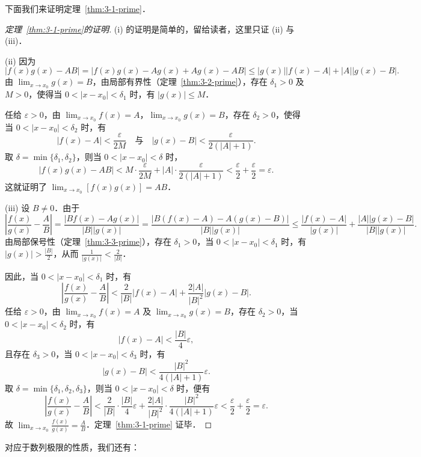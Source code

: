 下面我们来证明定理~\ref{thm:3-1-prime}．

\begin{proof}[定理~\ref{thm:3-1-prime}的证明]
(i) 的证明是简单的，留给读者，这里只证 (ii) 与 (iii)．

(ii) 因为
\[
|f(x)g(x) - AB| = |f(x)g(x) - Ag(x) + Ag(x) - AB| \leqslant |g(x)||f(x) - A| + |A||g(x) - B|.
\]
由 $\lim_{x \to x_0} g(x) = B$，由局部有界性（定理~\ref{thm:3-2-prime}），存在 $\delta_1 > 0$ 及 $M > 0$，使得当 $0 < |x - x_0| < \delta_1$ 时，有 $|g(x)| \leqslant M$．

任给 $\varepsilon > 0$，由 $\lim_{x \to x_0} f(x) = A$，$\lim_{x \to x_0} g(x) = B$，存在 $\delta_2 > 0$，使得当 $0 < |x - x_0| < \delta_2$ 时，有
\[
|f(x) - A| < \frac{\varepsilon}{2M} \quad \text{与} \quad |g(x) - B| < \frac{\varepsilon}{2(|A| + 1)}.
\]
取 $\delta = \min\{\delta_1, \delta_2\}$，则当 $0 < |x - x_0| < \delta$ 时，
\[
|f(x)g(x) - AB| < M \cdot \frac{\varepsilon}{2M} + |A| \cdot \frac{\varepsilon}{2(|A| + 1)} < \frac{\varepsilon}{2} + \frac{\varepsilon}{2} = \varepsilon.
\]
这就证明了 $\lim_{x \to x_0} [f(x)g(x)] = AB$．

(iii) 设 $B \neq 0$．由于
\[
\left|\frac{f(x)}{g(x)} - \frac{A}{B}\right| = \frac{|B f(x) - A g(x)|}{|B||g(x)|} = \frac{|B(f(x) - A) - A(g(x) - B)|}{|B||g(x)|} \leqslant \frac{|f(x) - A|}{|g(x)|} + \frac{|A||g(x) - B|}{|B||g(x)|}.
\]
由局部保号性（定理~\ref{thm:3-3-prime}），存在 $\delta_1 > 0$，当 $0 < |x - x_0| < \delta_1$ 时，有 $|g(x)| > \frac{|B|}{2}$，从而 $\frac{1}{|g(x)|} < \frac{2}{|B|}$．

因此，当 $0 < |x - x_0| < \delta_1$ 时，有
\[
\left|\frac{f(x)}{g(x)} - \frac{A}{B}\right| < \frac{2}{|B|}|f(x) - A| + \frac{2|A|}{|B|^2}|g(x) - B|.
\]
任给 $\varepsilon > 0$，由 $\lim_{x \to x_0} f(x) = A$ 及 $\lim_{x \to x_0} g(x) = B$，存在 $\delta_2 > 0$，当 $0 < |x - x_0| < \delta_2$ 时，有
\[
|f(x) - A| < \frac{|B|}{4}\varepsilon,
\]
且存在 $\delta_3 > 0$，当 $0 < |x - x_0| < \delta_3$ 时，有
\[
|g(x) - B| < \frac{|B|^2}{4(|A| + 1)}\varepsilon.
\]
取 $\delta = \min\{\delta_1, \delta_2, \delta_3\}$，则当 $0 < |x - x_0| < \delta$ 时，便有
\[
\left|\frac{f(x)}{g(x)} - \frac{A}{B}\right| < \frac{2}{|B|} \cdot \frac{|B|}{4}\varepsilon + \frac{2|A|}{|B|^2} \cdot \frac{|B|^2}{4(|A| + 1)}\varepsilon < \frac{\varepsilon}{2} + \frac{\varepsilon}{2} = \varepsilon.
\]
故 $\lim_{x \to x_0} \frac{f(x)}{g(x)} = \frac{A}{B}$．定理~\ref{thm:3-1-prime} 证毕．
\end{proof}

对应于数列极限的性质，我们还有：

